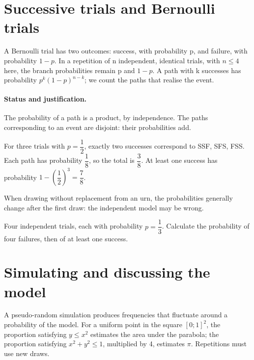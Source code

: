 \section{Successive trials and Bernoulli trials}\label{C05-U4}
\begin{keypoint}
A Bernoulli trial has two outcomes: success, with probability p, and failure, with probability $1-p$. In a repetition of n independent, identical trials, with $n\leq4$ here, the branch probabilities remain p and $1-p$. A path with k successes has probability $p^k(1-p)^{n-k}$; we count the paths that realise the event.
\end{keypoint}
\paragraph{Status and justification.} The probability of a path is a product, by independence. The paths corresponding to an event are disjoint: their probabilities add.
\begin{example}For three trials with $p=\dfrac{1}{2}$, exactly two successes correspond to SSF, SFS, FSS. Each path has probability $\dfrac{1}{8}$, so the total is $\dfrac{3}{8}$. At least one success has probability $1-(\dfrac{1}{2})^3=\dfrac{7}{8}$.\end{example}\label{C05-EX4}
\begin{pitfall}When drawing without replacement from an urn, the probabilities generally change after the first draw: the independent model may be wrong.\end{pitfall}
\begin{application}Four independent trials, each with probability $p=\dfrac{1}{3}$. Calculate the probability of four failures, then of at least one success.\end{application}\label{C05-AP4}
\section{Simulating and discussing the model}\label{C05-U5}
\begin{keypoint}
A pseudo-random simulation produces frequencies that fluctuate around a probability of the model. For a uniform point in the square $[0;1]^2$, the proportion satisfying $y\leq x^2$ estimates the area under the parabola; the proportion satisfying $x^2+y^2\leq1$, multiplied by 4, estimates $\pi$. Repetitions must use new draws.
\end{keypoint}
